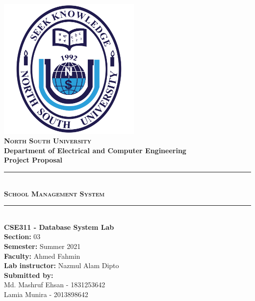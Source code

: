 \begin{titlepage}

\center
\includegraphics[width=70mm]{NSU LOGO 2021.png}\\[1cm]
\textsc{\LARGE \bfseries North South University}\\[0.3cm] 
\large \bfseries Department of Electrical and Computer Engineering\\[0.4cm]

\Large \textbf{Project Proposal}\\

\noindent\rule{13cm}{0.4pt}\\[0.4cm]
\textsc{\huge \bfseries School Management System}\\
\noindent\rule{13cm}{0.4pt}\\[0.2cm]

{\mdseries{}\selectfont
\large
\textbf{CSE311 - Database System Lab}\\
\textbf{Section:} 03\\
\textbf{Semester:} Summer 2021\\[0.3cm]
\textbf{Faculty:} Ahmed Fahmin\\
\textbf{Lab instructor:} Nazmul Alam Dipto\\[0.3cm]
\textbf{Submitted by:}\\
Md. Mashruf Ehsan - 1831253642\\
Lamia Munira - 2013898642\\
}

\end{titlepage}
